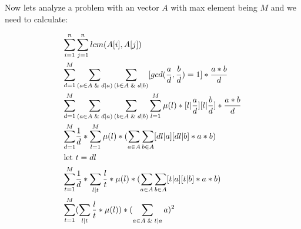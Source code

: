             Now lets analyze a problem with an vector $A$ with max element being $M$ and we need to calculate:


            \begin{align*}
                \sum_{i=1}^{n}& \sum_{j=1}^{n} lcm(A[i],A[j]) \\
                \sum_{d=1}^{M}& \sum_{(a \in A \And d|a)} \sum_{(b \in A \And d|b)} [gcd(\frac{a}{d},\frac{b}{d}) = 1] * \frac{a*b}{d} \\
                \sum_{d=1}^{M}& \sum_{(a \in A \And d|a)} \sum_{(b \in A \And d|b)} \sum_{l=1}^{M} \mu(l) * [l|\frac{a}{d}][l|\frac{b}{d}] * \frac{a*b}{d} \\
                \sum_{d=1}^{M}& \frac{1}{d} * \sum_{l=1}^{M} \mu(l) * ( \sum_{a \in A} \sum_{b \in A} [dl|a][dl|b] * a*b) \\
                \text{let }& t = dl\\
                \sum_{t=1}^{M}& \frac{1}{d} * \sum_{l|t} \frac{l}{t} * \mu(l) * ( \sum_{a \in A} \sum_{b \in A} [t|a][t|b] * a*b) \\
                \sum_{t=1}^{M}&(\sum_{l|t} \frac{l}{t} * \mu(l)) * ( \sum_{a \in A \And t|a} a)^2 
            \end{align*}